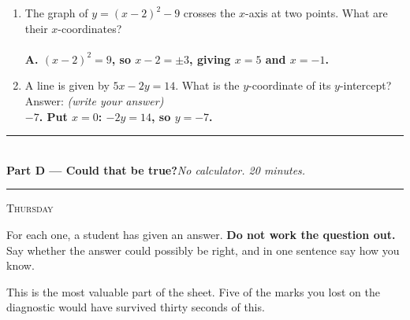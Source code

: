\documentclass[11pt,a4paper]{article}
\newcommand{\PartHead}[2]{%
  \vspace{6pt}
  {\color{navy}\rule{\textwidth}{0.8pt}}\\[2pt]
  {\large\bfseries\color{navy}#1}\hfill{\small\itshape #2}\\[-4pt]
  {\color{navy}\rule{\textwidth}{0.4pt}}
  \vspace{4pt}
}
\newcommand{\sitting}[1]{{\footnotesize\textsc{\color{navy}#1}}\par\vspace{2pt}}
\newcommand{\spr}{\\[3pt]\hspace*{6pt}Answer: \underline{\hspace{3.2cm}}\hfill{\footnotesize\itshape(write your answer)}}
\newcommand{\ans}[1]{\ {\color{keyred}\bfseries #1}}
\newcommand{\ans}[1]{}
\begin{document}
\begin{enumerate}[leftmargin=20pt,itemsep=8pt]
\item The graph of $y=(x-2)^2-9$ crosses the $x$-axis at two points. What are their $x$-coordinates?\\
  \ans{\\ A. $(x-2)^2=9$, so $x-2=\pm3$, giving $x=5$ and $x=-1$.}

\item A line is given by $5x-2y=14$. What is the $y$-coordinate of its $y$-intercept? \spr
  \ans{\\ $-7$. Put $x=0$: $-2y=14$, so $y=-7$.}
\end{enumerate}

\newpage
\PartHead{Part D --- Could that be true?}{No calculator. 20 minutes.}
\sitting{Thursday}
For each one, a student has given an answer. \textbf{Do not work the question out.}
Say whether the answer could possibly be right, and in one sentence say how you know.

This is the most valuable part of the sheet. Five of the marks you lost on the
diagnostic would have survived thirty seconds of this.
\end{document}
